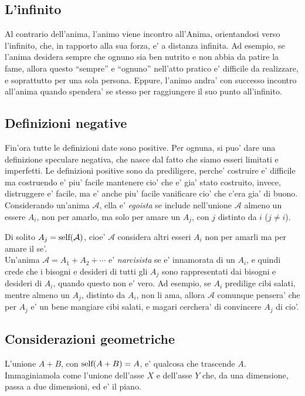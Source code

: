 \subsection{L'infinito}

Al contrario dell'anima, l'animo viene incontro all'Anima, orientandosi verso l'infinito, che, in rapporto alla sua forza, e' a distanza infinita. Ad esempio, se l'anima desidera sempre che ognuno sia ben nutrito e non abbia da patire la fame, allora questo ``sempre'' e ``ognuno'' nell'atto pratico e' difficile da realizzare, e soprattutto per una sola persona. Eppure, l'animo andra' con successo incontro all'anima quando spendera' se stesso per raggiungere il suo punto all'infinito.


\subsection{Definizioni negative}

Fin'ora tutte le definizioni date sono positive. Per ognuna, si puo' dare una definizione speculare negativa, che nasce dal fatto che siamo esseri limitati e imperfetti. Le definizioni positive sono da prediligere, perche' costruire e' difficile ma costruendo e' piu' facile mantenere cio' che e' gia' stato costruito, invece, distruggere e' facile, ma e' anche piu' facile vanificare cio' che c'era gia' di buono.\\

Considerando un'anima $\mathcal{A}$, ella e' \emph{egoista} se include nell'unione $\mathcal{A}$ almeno un essere $A_i$, non per amarlo, ma solo per amare un $A_j$, con $j$ distinto da $i$ ($j\ne i$).

Di solito $A_j = \textrm{self}(\mathcal{A})$, cioe' $\mathcal{A}$ considera altri esseri $A_i$ non per amarli ma per amare il se'.\\

Un'anima $\mathcal{A}=A_1+A_2+\cdots$ e' \emph{narcisista} se e' innamorata di un $A_i$, e quindi crede che i bisogni e desideri di tutti gli $A_j$ sono rappresentati dai bisogni e desideri di $A_i$, quando questo non e' vero. Ad esempio, se $A_i$ predilige cibi salati, mentre almeno un $A_j$, distinto da $A_i$, non li ama, allora $\mathcal{A}$ comunque pensera' che per $A_j$ e' un bene mangiare cibi salati, e magari cerchera' di convincere $A_j$ di cio'.

\subsection{Considerazioni geometriche}
L'unione $A+B$, con $\textrm{self}(A+B)=A$, e' qualcosa che trascende $A$. Immaginiamola come l'unione dell'asse $X$ e dell'asse $Y$ che, da una dimensione, passa a due dimensioni, ed e' il piano.

